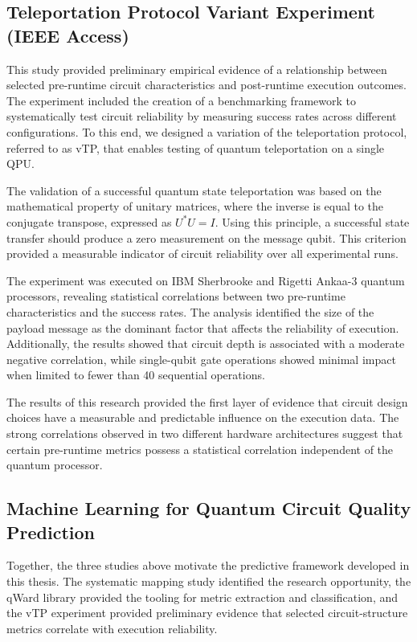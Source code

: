 \documentclass{article}
\begin{document}
\subsection{Teleportation Protocol Variant Experiment (IEEE Access)}
\label{subsection:vtp}

This study \cite{ieeevTp2025} provided preliminary empirical evidence of a relationship between selected pre-runtime circuit characteristics and post-runtime execution outcomes. The experiment included the creation of a benchmarking framework to systematically test circuit reliability by measuring success rates across different configurations. To this end, we designed a variation of the teleportation protocol, referred to as vTP, that enables testing of quantum teleportation on a single QPU.

The validation of a successful quantum state teleportation was based on the mathematical property of unitary matrices, where the inverse is equal to the conjugate transpose, expressed as $U^{*}U=I$. Using this principle, a successful state transfer should produce a zero measurement on the message qubit. This criterion provided a measurable indicator of circuit reliability over all experimental runs.

The experiment was executed on IBM Sherbrooke and Rigetti Ankaa-3 quantum processors, revealing statistical correlations between two pre-runtime characteristics and the success rates. The analysis identified the size of the payload message as the dominant factor that affects the reliability of execution. Additionally, the results showed that circuit depth is associated with a moderate negative correlation, while single-qubit gate operations showed minimal impact when limited to fewer than 40 sequential operations.

The results of this research provided the first layer of evidence that circuit design choices have a measurable and predictable influence on the execution data. The strong correlations observed in two different hardware architectures suggest that certain pre-runtime metrics possess a statistical correlation independent of the quantum processor.

\subsection{Machine Learning for Quantum Circuit Quality Prediction}
\label{subsec:ml-prediction}

Together, the three studies above motivate the predictive framework developed in this thesis. The systematic mapping study identified the research opportunity, the qWard library provided the tooling for metric extraction and classification, and the vTP experiment provided preliminary evidence that selected circuit-structure metrics correlate with execution reliability.
\end{document}
